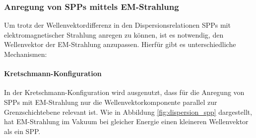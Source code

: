 \documentclass[titlepage,  ngerman]{article}
\begin{document}
	\subsubsection{Anregung von SPPs mittels EM-Strahlung}
	\label{sec:exictation}
	Um trotz der Wellenvektordifferenz in den Dispersionsrelationen SPPs mit elektromagnetischer Strahlung anregen zu können, ist es notwendig, den Wellenvektor der EM-Strahlung anzupassen. Hierfür gibt es unterschiedliche Mechanismen:
	\paragraph{Kretschmann-Konfiguration}
	In der Kretschmann-Konfiguration wird ausgenutzt, dass für die Anregung von SPPs mit EM-Strahlung nur die Wellenvektorkomponente parallel zur Grenzschichtebene relevant ist. Wie in Abbildung \ref{fig:dispersion_spp} dargestellt, hat EM-Strahlung im Vakuum bei gleicher Energie einen kleineren Wellenvektor als ein SPP. 
	
\end{document}
